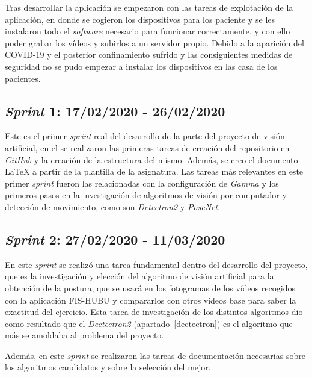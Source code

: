 Tras desarrollar la aplicación se empezaron con las tareas de explotación de la aplicación, en donde se cogieron los dispositivos para los paciente y se les instalaron todo el \textit{software} necesario para funcionar correctamente, y con ello poder grabar los vídeos y subirlos a un servidor propio. Debido a la aparición del COVID-19 y el posterior confinamiento sufrido y las consiguientes medidas de seguridad no se pudo empezar a instalar los dispositivos en las casa de los pacientes.
\subsection{\textit{Sprint} 1: 17/02/2020 - 26/02/2020}
Este es el primer \textit{sprint} real del desarrollo de la parte del proyecto de visión artificial, en el se realizaron las primeras tareas de creación del repositorio en \textit{GitHub} y la creación de la estructura del mismo. Además, se creo el documento \LaTeX{} a partir de la plantilla de la asignatura. Las tareas más relevantes en este primer \textit{sprint} fueron las relacionadas con la configuración de \textit{Gamma} y los primeros pasos en la investigación de algoritmos de visión por computador y detección de movimiento, como son \textit{Detectron2} y \textit{PoseNet}.
\subsection{\textit{Sprint} 2: 27/02/2020 - 11/03/2020}
En este \textit{sprint} se realizó una tarea fundamental dentro del desarrollo del proyecto, que es la investigación y elección del algoritmo de visión artificial para la obtención de la postura, que se usará en los fotogramas de los vídeos recogidos con la aplicación FIS-HUBU y compararlos con otros vídeos base para saber la exactitud del ejercicio. Esta tarea de investigación de los distintos algoritmos dio como resultado que el \textit{Dectectron2} (apartado~\ref{dectectron}) es el algoritmo que más se amoldaba al problema del proyecto.

Además, en este \textit{sprint} se realizaron las tareas de documentación necesarias sobre los algoritmos candidatos y sobre la selección del mejor.
